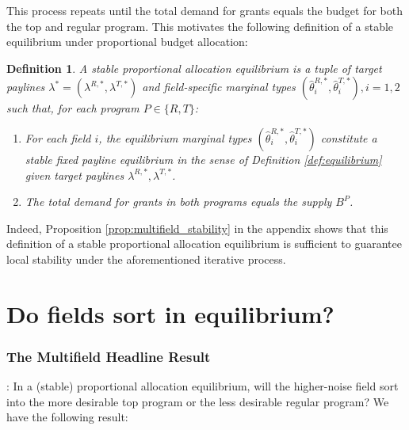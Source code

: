 \documentclass[12pt,reqno]{amsart}
\newtheorem{definition}{Definition}
\theoremstyle{definition}
\theoremstyle{plain} %
\begin{document}
This process repeats until the total demand for grants equals the budget for both the top and regular program. This motivates the following definition of a stable equilibrium under proportional budget allocation:

\begin{definition}\label{def:multifieldequilibrium}
A stable proportional allocation equilibrium is a tuple of target paylines $\lambda^* = (\lambda^{R,*}, \lambda^{T,*})$ and field-specific marginal types $(\hat{\theta}^{R,*}_i, \hat{\theta}^{T,*}_i),i=1,2$ such that, for each program $P\in \{R,T\}$:
\vspace{-5pt}
\begin{enumerate}[label=(\arabic*),ref=\thedefinition(\arabic*)]
   \item For each field $i$, the equilibrium marginal types $(\hat{\theta}^{R,*}_i,\hat{\theta}^{T,*}_i )$ constitute a stable fixed payline equilibrium in the sense of Definition \ref{def:equilibrium} given target paylines $\lambda^{R,*},\lambda^{T,*}$.  
   \item The total demand for grants in both programs equals the supply $B^P$. 
\end{enumerate}
\end{definition}

\noindent Indeed, Proposition \ref{prop:multifield_stability} in the appendix shows that this definition of a stable proportional allocation equilibrium is sufficient to guarantee local stability under the aforementioned iterative process. 

\section{Do fields sort in equilibrium?}\label{section:multifield}

\subsubsection{The Multifield Headline Result}: In a (stable) proportional allocation equilibrium, will the higher-noise field sort into the more desirable top program or the less desirable regular program? We have the following result:
\end{document}
